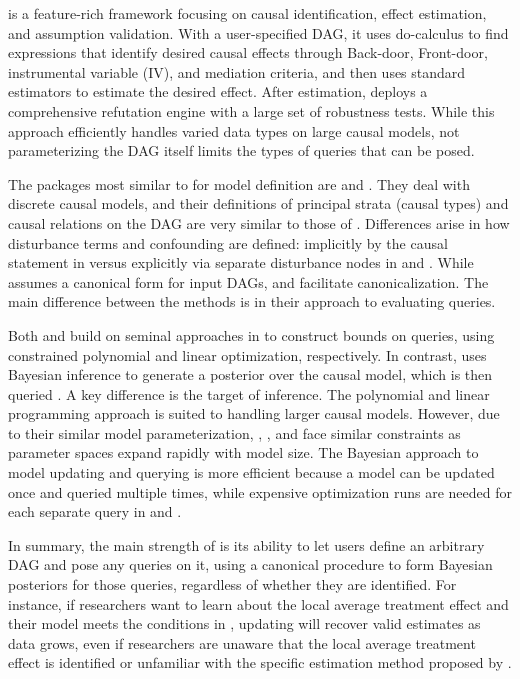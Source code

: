 \documentclass[
  11pt,
  article]{jss}
\begin{document}
 is a feature-rich framework focusing on causal
identification, effect estimation, and assumption validation. With a
user-specified DAG, it uses do-calculus to find expressions that
identify desired causal effects through Back-door, Front-door,
instrumental variable (IV), and mediation criteria, and then uses
standard estimators to estimate the desired effect. After estimation,
 deploys a comprehensive refutation engine with a large set
of robustness tests. While this approach efficiently handles varied data
types on large causal models, not parameterizing the DAG itself limits
the types of queries that can be posed.

The packages most similar to  for model definition
are  and . They deal with discrete
causal models, and their definitions of principal strata (causal types)
and causal relations on the DAG are very similar to those of
. Differences arise in how disturbance terms and
confounding are defined: implicitly by the causal statement in
 versus explicitly via separate disturbance nodes in
 and . While 
assumes a canonical form for input DAGs,  and
 facilitate canonicalization. The main difference
between the methods is in their approach to evaluating queries.

Both  and  build on seminal approaches
in \citet{balke_bounds_1997} to construct bounds on queries, using
constrained polynomial and linear optimization, respectively. In
contrast,  uses Bayesian inference to generate a
posterior over the causal model, which is then queried \citep[consistent
with][]{chickering_clinicians_1996, zhang_partial_2022}. A key
difference is the target of inference. The polynomial and linear
programming approach is suited to handling larger causal models.
However, due to their similar model parameterization, ,
, and  face similar constraints as
parameter spaces expand rapidly with model size. The Bayesian approach
to model updating and querying is more efficient because a model can be
updated once and queried multiple times, while expensive optimization
runs are needed for each separate query in  and
.

In summary, the main strength of  is its ability to
let users define an arbitrary DAG and pose any queries on it, using a
canonical procedure to form Bayesian posteriors for those queries,
regardless of whether they are identified. For instance, if researchers
want to learn about the local average treatment effect and their model
meets the conditions in \citet{angrist_identification_1996}, updating
will recover valid estimates as data grows, even if researchers are
unaware that the local average treatment effect is identified or
unfamiliar with the specific estimation method proposed by
\citet{angrist_identification_1996}.
\end{document}
